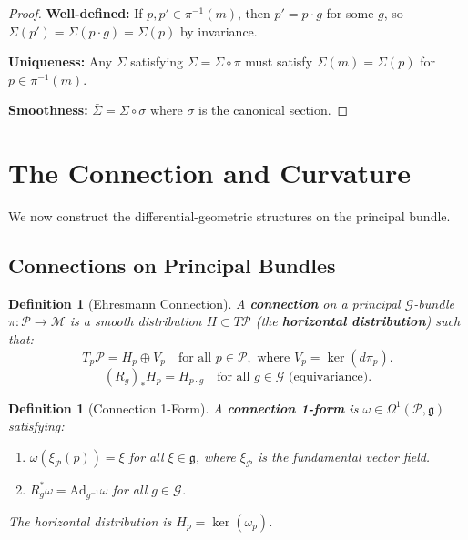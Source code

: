 \documentclass[11pt]{article}
\newtheorem{definition}[theorem]{Definition}
\begin{document}
\begin{proof}
\textbf{Well-defined:} If $p, p' \in \pi^{-1}(m)$, then $p' = p \cdot g$ for some $g$, so $\Sigma(p') = \Sigma(p \cdot g) = \Sigma(p)$
by invariance.

\textbf{Uniqueness:} Any $\bar{\Sigma}$ satisfying $\Sigma = \bar{\Sigma} \circ \pi$ must satisfy $\bar{\Sigma}(m) = \Sigma(p)$ for $p \in \pi^{-1}(m)$.

\textbf{Smoothness:} $\bar{\Sigma} = \Sigma \circ \sigma$ where $\sigma$ is the canonical section.
\end{proof}

\section{The Connection and Curvature}

We now construct the differential-geometric structures on the principal bundle.

\subsection{Connections on Principal Bundles}

\begin{definition}[Ehresmann Connection]
A \textbf{connection} on a principal $\mathcal{G}$-bundle $\pi : \mathcal{P} \to \mathcal{M}$
is a smooth distribution $H \subset T\mathcal{P}$ (the \textbf{horizontal distribution}) such that:
\[
T_p \mathcal{P} = H_p \oplus V_p \quad \text{for all } p \in \mathcal{P}, \text{ where } V_p = \ker(d\pi_p).
\]
\[
(R_g)_* H_p = H_{p \cdot g} \quad \text{for all } g \in \mathcal{G} \text{ (equivariance)}.
\]
\end{definition}

\begin{definition}[Connection 1-Form]
A \textbf{connection 1-form} is $\omega \in \Omega^1(\mathcal{P}, \mathfrak{g})$ satisfying:
\begin{enumerate}
    \item[(i)] $\omega(\xi_{\mathcal{P}}(p)) = \xi$ for all $\xi \in \mathfrak{g}$, where $\xi_{\mathcal{P}}$ is the fundamental vector field.
    \item[(ii)] $R_g^* \omega = \mathrm{Ad}_{g^{-1}} \omega$ for all $g \in \mathcal{G}$.
\end{enumerate}
The horizontal distribution is $H_p = \ker(\omega_p)$.
\end{definition}
\end{document}
